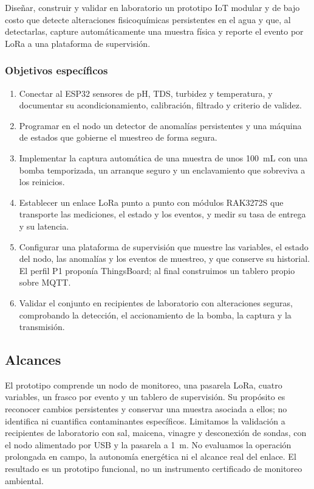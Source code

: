 Diseñar, construir y validar en laboratorio un prototipo IoT modular y de bajo costo que detecte alteraciones fisicoquímicas persistentes en el agua y que, al detectarlas, capture automáticamente una muestra física y reporte el evento por LoRa a una plataforma de supervisión.

\subsubsection{Objetivos específicos}

\begin{enumerate}
    \item Conectar al ESP32 sensores de pH, TDS, turbidez y temperatura, y documentar su acondicionamiento, calibración, filtrado y criterio de validez.
    \item Programar en el nodo un detector de anomalías persistentes y una máquina de estados que gobierne el muestreo de forma segura.
    \item Implementar la captura automática de una muestra de unos 100~mL con una bomba temporizada, un arranque seguro y un enclavamiento que sobreviva a los reinicios.
    \item Establecer un enlace LoRa punto a punto con módulos RAK3272S que transporte las mediciones, el estado y los eventos, y medir su tasa de entrega y su latencia.
    \item Configurar una plataforma de supervisión que muestre las variables, el estado del nodo, las anomalías y los eventos de muestreo, y que conserve su historial. El perfil P1 proponía ThingsBoard; al final construimos un tablero propio sobre MQTT.
    \item Validar el conjunto en recipientes de laboratorio con alteraciones seguras, comprobando la detección, el accionamiento de la bomba, la captura y la transmisión.
\end{enumerate}

\subsection{Alcances}

El prototipo comprende un nodo de monitoreo, una pasarela LoRa, cuatro variables, un frasco por evento y un tablero de supervisión. Su propósito es reconocer cambios persistentes y conservar una muestra asociada a ellos; no identifica ni cuantifica contaminantes específicos. Limitamos la validación a recipientes de laboratorio con sal, maicena, vinagre y desconexión de sondas, con el nodo alimentado por USB y la pasarela a 1~m. No evaluamos la operación prolongada en campo, la autonomía energética ni el alcance real del enlace. El resultado es un prototipo funcional, no un instrumento certificado de monitoreo ambiental.

